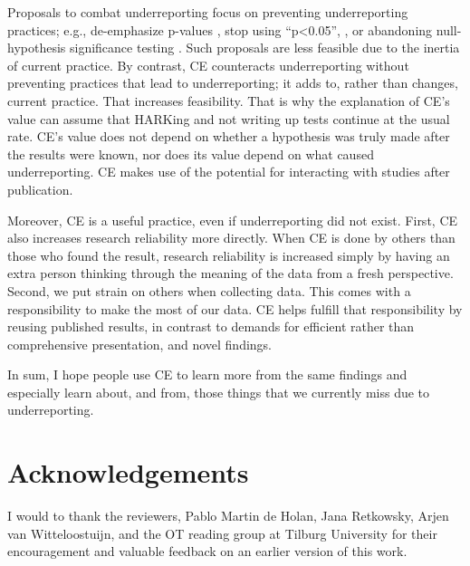 \documentclass[authordate, meta]{jote-new-article}
\begin{document}
Proposals to combat underreporting focus on preventing underreporting practices; e.g., de-emphasize p-values \parencite{Bettis2012}, stop using “p<0.05”, \parencite{Bettis2012, Wasserstein2019}, or abandoning null-hypothesis significance testing \parencite{Schwab2011}. Such proposals are less feasible due to the inertia of current practice. By contrast, CE counteracts underreporting without preventing practices that lead to underreporting; it adds to, rather than changes, current practice. That increases feasibility. That is why the explanation of CE’s value can assume that HARKing and not writing up tests continue at the usual rate. CE’s value does not depend on whether a hypothesis was truly made after the results were known, nor does its value depend on what caused underreporting. CE makes use of the potential for interacting with studies after publication.

Moreover, CE is a useful practice, even if underreporting did not exist. First, CE also increases research reliability more directly. When CE is done by others than those who found the result, research reliability is increased simply by having an extra person thinking through the meaning of the data from a fresh perspective. Second, we put strain on others when collecting data. This comes with a responsibility to make the most of our data. CE helps fulfill that responsibility by reusing published results, in contrast to demands for efficient rather than comprehensive presentation, and novel findings.

In sum, I hope people use CE to learn more from the same findings and especially learn about, and from, those things that we currently miss due to underreporting.
\clearpage



\section{Acknowledgements}

I would to thank the reviewers, Pablo Martin de Holan, Jana Retkowsky, Arjen van Witteloostuijn, and the OT reading group at Tilburg University for their encouragement and valuable feedback on an earlier version of this work.



\printbibliography
\end{document}
